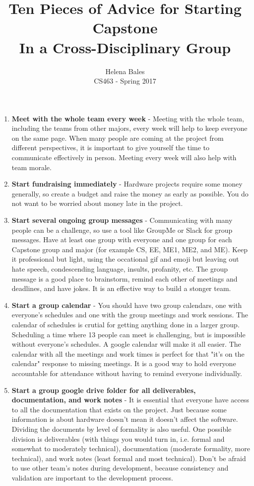 \documentclass[letterpaper,10pt]{article}
\title{Ten Pieces of Advice for Starting Capstone\\ In a Cross-Disciplinary Group}
\author{Helena Bales \\ CS463 - Spring 2017}
\begin{document}
\maketitle

\begin{enumerate}
\item{
\textbf{Meet with the whole team every week} - Meeting with the whole team, including the teams from other majors, every week will help to keep everyone on the same page. When many people are coming at the project from different perspectives, it is important to give yourself the time to communicate effectively in person. Meeting every week will also help with team morale.
}
\item{
\textbf{Start fundraising immediately} - Hardware projects require some money generally, so create a budget and raise the money as early as possible. You do not want to be worried about money late in the project.
}
\item{
\textbf{Start several ongoing group messages} - Communicating with many people can be a challenge, so use a tool like GroupMe or Slack for group messages. Have at least one group with everyone and one group for each Capstone group and major (for example CS, EE, ME1, ME2, and ME). Keep it professional but light, using the occational gif and emoji but leaving out hate speech, condescending language, insults, profanity, etc. The group message is a good place to brainstorm, remind each other of meetings and deadlines, and have jokes. It is an effective way to build a stonger team.
}
\item{
\textbf{Start a group calendar} - You should have two group calendars, one with everyone's schedules and one with the group meetings and work sessions. The calendar of schedules is crutial for getting anything done in a larger group. Scheduling a time where 13 people can meet is challenging, but is impossible without everyone's schedules. A google calendar will make it all easier. The calendar with all the meetings and work times is perfect for that "it's on the calendar" response to missing meetings. It is a good way to hold everyone accountable for attendance without having to remind everyone individually.
}
\item{
\textbf{Start a group google drive folder for all deliverables, documentation, and work notes} - It is essential that everyone have access to all the documentation that exists on the project. Just because some information is about hardware doesn't mean it doesn't affect the software. Dividing the documents by level of formality is also useful. One possible division is deliverables (with things you would turn in, i.e. formal and somewhat to moderately technical), documentation (moderate formality, more technical), and work notes (least formal and most technical). Don't be afraid to use other team's notes during development, because consistency and validation are important to the development process.
}
\end{enumerate}
\end{document}
